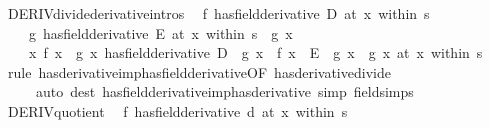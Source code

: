 \begin{isabellebody}
\isamarkupfalse%
\ DERIV{\isacharunderscore}{\kern0pt}divide{\isacharbrackleft}{\kern0pt}derivative{\isacharunderscore}{\kern0pt}intros{\isacharbrackright}{\kern0pt}{\isacharcolon}{\kern0pt}\isanewline
\ \ {\isachardoublequoteopen}{\isacharparenleft}{\kern0pt}f\ has{\isacharunderscore}{\kern0pt}field{\isacharunderscore}{\kern0pt}derivative\ D{\isacharparenright}{\kern0pt}\ {\isacharparenleft}{\kern0pt}at\ x\ within\ s{\isacharparenright}{\kern0pt}\ {\isasymLongrightarrow}\isanewline
\ \ \ \ {\isacharparenleft}{\kern0pt}g\ has{\isacharunderscore}{\kern0pt}field{\isacharunderscore}{\kern0pt}derivative\ E{\isacharparenright}{\kern0pt}\ {\isacharparenleft}{\kern0pt}at\ x\ within\ s{\isacharparenright}{\kern0pt}\ {\isasymLongrightarrow}\ g\ x\ {\isasymnoteq}\ {}\ {\isasymLongrightarrow}\isanewline
\ \ \ \ {\isacharparenleft}{\kern0pt}{\isacharparenleft}{\kern0pt}{\isasymlambda}x{\isachardot}{\kern0pt}\ f\ x\ {\isacharslash}{\kern0pt}\ g\ x{\isacharparenright}{\kern0pt}\ has{\isacharunderscore}{\kern0pt}field{\isacharunderscore}{\kern0pt}derivative\ {\isacharparenleft}{\kern0pt}D\ {\isacharasterisk}{\kern0pt}\ g\ x\ {\isacharminus}{\kern0pt}\ f\ x\ {\isacharasterisk}{\kern0pt}\ E{\isacharparenright}{\kern0pt}\ {\isacharslash}{\kern0pt}\ {\isacharparenleft}{\kern0pt}g\ x\ {\isacharasterisk}{\kern0pt}\ g\ x{\isacharparenright}{\kern0pt}{\isacharparenright}{\kern0pt}\ {\isacharparenleft}{\kern0pt}at\ x\ within\ s{\isacharparenright}{\kern0pt}{\isachardoublequoteclose}\isanewline
%
\isadelimproof
\ \ %
\endisadelimproof
%
\isatagproof
{}\isamarkupfalse%
\ {\isacharparenleft}{\kern0pt}rule\ has{\isacharunderscore}{\kern0pt}derivative{\isacharunderscore}{\kern0pt}imp{\isacharunderscore}{\kern0pt}has{\isacharunderscore}{\kern0pt}field{\isacharunderscore}{\kern0pt}derivative{\isacharbrackleft}{\kern0pt}OF\ has{\isacharunderscore}{\kern0pt}derivative{\isacharunderscore}{\kern0pt}divide{\isacharbrackright}{\kern0pt}{\isacharparenright}{\kern0pt}\isanewline
\ \ \ \ \ {\isacharparenleft}{\kern0pt}auto\ dest{\isacharcolon}{\kern0pt}\ has{\isacharunderscore}{\kern0pt}field{\isacharunderscore}{\kern0pt}derivative{\isacharunderscore}{\kern0pt}imp{\isacharunderscore}{\kern0pt}has{\isacharunderscore}{\kern0pt}derivative\ simp{\isacharcolon}{\kern0pt}\ field{\isacharunderscore}{\kern0pt}simps{\isacharparenright}{\kern0pt}%
\endisatagproof
{\isafoldproof}%
%
\isadelimproof
\isanewline
%
\endisadelimproof
\isanewline
{}\isamarkupfalse%
\ DERIV{\isacharunderscore}{\kern0pt}quotient{\isacharcolon}{\kern0pt}\isanewline
\ \ {\isachardoublequoteopen}{\isacharparenleft}{\kern0pt}f\ has{\isacharunderscore}{\kern0pt}field{\isacharunderscore}{\kern0pt}derivative\ d{\isacharparenright}{\kern0pt}\ {\isacharparenleft}{\kern0pt}at\ x\ within\ s{\isacharparenright}{\kern0pt}\ {\isasymLongrightarrow}\isanewline

\end{isabellebody}
